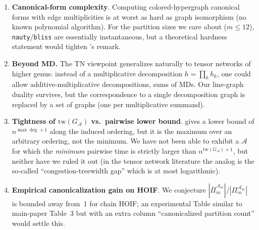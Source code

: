 \documentclass[11pt]{article}
\newcommand{\calA}{\mathcal{A}}
\newcommand{\tw}{\mathrm{tw}}
\theoremstyle{plain}
\theoremstyle{definition}
\begin{document}
\begin{enumerate}[leftmargin=2em]
\item \textbf{Canonical-form complexity}.  Computing colored-hypergraph
canonical forms with edge multiplicities is at worst as hard as graph
isomorphism (no known polynomial algorithm).  For the partition sizes we
care about ($m\leq 12$), \texttt{nauty}/\texttt{bliss} are essentially
instantaneous, but a theoretical hardness statement would tighten
's remark.

\item \textbf{Beyond MD.}  The TN viewpoint generalizes naturally to
tensor networks of higher genus: instead of a multiplicative
decomposition $h=\prod_k h_k$, one could allow additive-multiplicative
decompositions, sums of MDs.  Our line-graph duality survives, but the
correspondence to a single decomposition graph is replaced by a set of
graphs (one per multiplicative summand).

\item \textbf{Tightness of $\tw(G_\calA)$ vs.\ pairwise lower bound}.
 gives a lower bound of
$n^{\max\deg+1}$ along the induced ordering, but it is the maximum
over an arbitrary ordering, not the minimum.  We have not been able to
exhibit a $\calA$ for which the \emph{minimum} pairwise time is strictly
larger than $n^{\tw(G_\calA)+1}$, but neither have we ruled it out
(in the tensor network literature the analog is the so-called
``congestion-treewidth gap'' which is at most logarithmic).

\item \textbf{Empirical canonicalization gain on HOIF}.  We conjecture
$|\overline{\Pi}_m^{\calA_m}|/|\Pi_m^{\calA_m}|$ is bounded away from~1
for chain HOIF; an experimental Table similar to main-paper Table~3 but
with an extra column ``canonicalized partition count'' would settle
this.
\end{enumerate}
\end{document}
